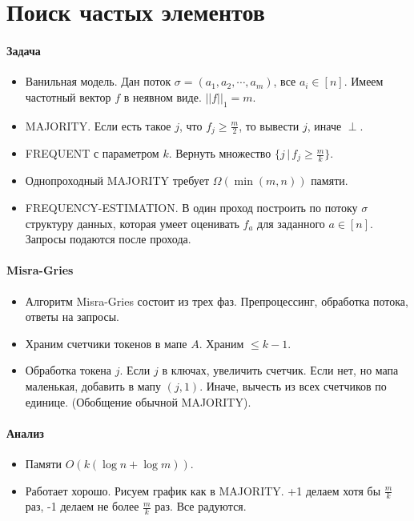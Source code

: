 \section{Поиск частых элементов} %
\label{sec:frequent_elements_problem}

\paragraph{Задача} %
\label{par:problem}
\begin{itemize}
	\item Ванильная модель. Дан поток $\sigma = (a_1, a_2, \cdots, a_m)$, все $a_i \in [n]$. Имеем частотный вектор $f$ в неявном виде. $||f||_1 = m$. 
	\item MAJORITY. Если есть такое $j$, что $f_j \geq \frac{m}{2}$, то вывести $j$, иначе $\perp$.
	\item FREQUENT с параметром $k$. Вернуть множество $\{j\,|\,f_j \geq \frac{m}{k} \}$.
	\item Однопроходный MAJORITY требует $\Omega(\min(m, n))$ памяти.
	\item FREQUENCY-ESTIMATION. В один проход построить по потоку $\sigma$ структуру данных, которая умеет оценивать $f_a$ для заданного $a \in [n]$. Запросы подаются после прохода. 
\end{itemize}

\paragraph{Misra-Gries} %
\label{par:misra_gries}

\begin{itemize}
	\item Алгоритм Misra-Gries состоит из трех фаз. Препроцессинг, обработка потока, ответы на запросы.
	\item Храним счетчики токенов в мапе $A$. Храним $\leq k - 1$.
	\item Обработка токена $j$. Если $j$ в ключах, увеличить счетчик. Если нет, но мапа маленькая, добавить в мапу $(j, 1)$. Иначе, вычесть из всех счетчиков по единице. (Обобщение обычной MAJORITY).	
\end{itemize}


\paragraph{Анализ} %
\label{par:analysis}
\begin{itemize}
	\item Памяти $O(k(\log n + \log m))$.
	\item Работает хорошо. Рисуем график как в MAJORITY. +1 делаем хотя бы $\frac{m}{k}$ раз, -1 делаем не более $\frac{m}{k}$ раз. Все радуются.
\end{itemize}


